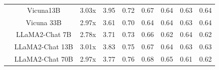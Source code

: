 \documentclass{article}
\theoremstyle{plain}
\theoremstyle{definition}
\theoremstyle{remark}
\begin{document}
\begin{table}
\begin{tabular}{ccccccccc}
          & Vicuna13B & 3.03x & 3.95  & 0.72  & 0.67  & 0.64  & 0.63  & 0.64 \\
          & Vicuna 33B & 2.97x & 3.61  & 0.70  & 0.64  & 0.64  & 0.63  & 0.64 \\
          & LLaMA2-Chat 7B & 2.78x & 3.71  & 0.73  & 0.66  & 0.62  & 0.64  & 0.62 \\
          & LLaMA2-Chat 13B & 3.01x & 3.83  & 0.75  & 0.67  & 0.64  & 0.63  & 0.63 \\
          & LLaMA2-Chat 70B & 2.97x & 3.77  & 0.76  & 0.68  & 0.65  & 0.61  & 0.62 \\
    \bottomrule
    \end{tabular}%
  \label{tab:a}%
\end{table}%


\end{document}
